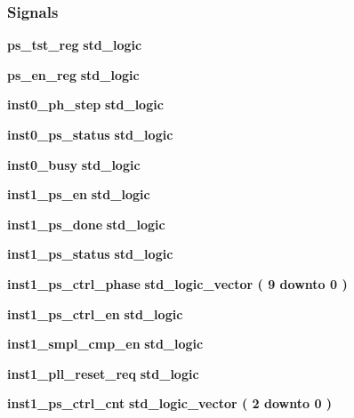 \subsubsection*{Signals}
 \begin{DoxyCompactItemize}
\item 
{\bf ps\+\_\+tst\+\_\+reg} {\bfseries \textcolor{comment}{std\+\_\+logic}\textcolor{vhdlchar}{ }} 
\item 
{\bf ps\+\_\+en\+\_\+reg} {\bfseries \textcolor{comment}{std\+\_\+logic}\textcolor{vhdlchar}{ }} 
\item 
{\bf inst0\+\_\+ph\+\_\+step} {\bfseries \textcolor{comment}{std\+\_\+logic}\textcolor{vhdlchar}{ }} 
\item 
{\bf inst0\+\_\+ps\+\_\+status} {\bfseries \textcolor{comment}{std\+\_\+logic}\textcolor{vhdlchar}{ }} 
\item 
{\bf inst0\+\_\+busy} {\bfseries \textcolor{comment}{std\+\_\+logic}\textcolor{vhdlchar}{ }} 
\item 
{\bf inst1\+\_\+ps\+\_\+en} {\bfseries \textcolor{comment}{std\+\_\+logic}\textcolor{vhdlchar}{ }} 
\item 
{\bf inst1\+\_\+ps\+\_\+done} {\bfseries \textcolor{comment}{std\+\_\+logic}\textcolor{vhdlchar}{ }} 
\item 
{\bf inst1\+\_\+ps\+\_\+status} {\bfseries \textcolor{comment}{std\+\_\+logic}\textcolor{vhdlchar}{ }} 
\item 
{\bf inst1\+\_\+ps\+\_\+ctrl\+\_\+phase} {\bfseries \textcolor{comment}{std\+\_\+logic\+\_\+vector}\textcolor{vhdlchar}{ }\textcolor{vhdlchar}{(}\textcolor{vhdlchar}{ }\textcolor{vhdlchar}{ } \textcolor{vhdldigit}{9} \textcolor{vhdlchar}{ }\textcolor{keywordflow}{downto}\textcolor{vhdlchar}{ }\textcolor{vhdlchar}{ } \textcolor{vhdldigit}{0} \textcolor{vhdlchar}{ }\textcolor{vhdlchar}{)}\textcolor{vhdlchar}{ }} 
\item 
{\bf inst1\+\_\+ps\+\_\+ctrl\+\_\+en} {\bfseries \textcolor{comment}{std\+\_\+logic}\textcolor{vhdlchar}{ }} 
\item 
{\bf inst1\+\_\+smpl\+\_\+cmp\+\_\+en} {\bfseries \textcolor{comment}{std\+\_\+logic}\textcolor{vhdlchar}{ }} 
\item 
{\bf inst1\+\_\+pll\+\_\+reset\+\_\+req} {\bfseries \textcolor{comment}{std\+\_\+logic}\textcolor{vhdlchar}{ }} 
\item 
{\bf inst1\+\_\+ps\+\_\+ctrl\+\_\+cnt} {\bfseries \textcolor{comment}{std\+\_\+logic\+\_\+vector}\textcolor{vhdlchar}{ }\textcolor{vhdlchar}{(}\textcolor{vhdlchar}{ }\textcolor{vhdlchar}{ } \textcolor{vhdldigit}{2} \textcolor{vhdlchar}{ }\textcolor{keywordflow}{downto}\textcolor{vhdlchar}{ }\textcolor{vhdlchar}{ } \textcolor{vhdldigit}{0} \textcolor{vhdlchar}{ }\textcolor{vhdlchar}{)}\textcolor{vhdlchar}{ }} 

\end{DoxyCompactItemize}
